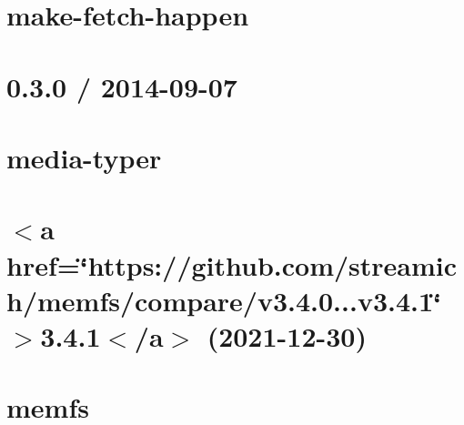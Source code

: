 \documentclass[twoside]{book}
\newcommand{\+}{\discretionary{\mbox{\scriptsize$\hookleftarrow$}}{}{}}
\begin{document}
\chapter{make-\/fetch-\/happen}
\label{md__c___users_vaishnavi_jadhav__desktop__developer_code_mean_stack_example_client_node_modules_make_fetch_happen__r_e_a_d_m_e}

\chapter{0.3.0 / 2014-\/09-\/07}
\label{md__c___users_vaishnavi_jadhav__desktop__developer_code_mean_stack_example_client_node_modules_media_typer__h_i_s_t_o_r_y}

\chapter{media-\/typer}
\label{md__c___users_vaishnavi_jadhav__desktop__developer_code_mean_stack_example_client_node_modules_media_typer__r_e_a_d_m_e}

\chapter{\texorpdfstring{$<$}{<}a href=\char`\"{}https\+://github.\+com/streamich/memfs/compare/v3.\+4.\+0...\+v3.\+4.\+1\char`\"{} \texorpdfstring{$>$}{>}3.4.1\texorpdfstring{$<$}{<}/a\texorpdfstring{$>$}{>} (2021-\/12-\/30)}
\label{md__c___users_vaishnavi_jadhav__desktop__developer_code_mean_stack_example_client_node_modules_memfs__c_h_a_n_g_e_l_o_g}

\chapter{memfs}
\label{md__c___users_vaishnavi_jadhav__desktop__developer_code_mean_stack_example_client_node_modules_memfs__r_e_a_d_m_e}

\end{document}
